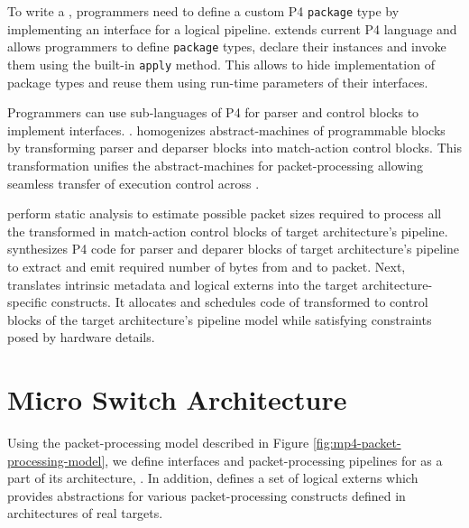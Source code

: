 \documentclass[letterpaper,twocolumn,10pt]{article}
\begin{document}
To write a \uprogram, programmers need to define a custom P4 \texttt{package} type by implementing an interface for a logical pipeline.
\ucomp extends current P4 language and allows programmers to define \texttt{package} types, declare their instances and invoke them using the built-in \texttt{apply} method.
This allows to hide implementation of package types and reuse them using run-time parameters of their interfaces.


Programmers can use sub-languages of P4 for parser and control blocks to implement interfaces.
\ucomp.
\ucomp homogenizes abstract-machines of programmable blocks by transforming parser and deparser blocks into match-action control blocks.
This transformation unifies the abstract-machines for packet-processing allowing seamless transfer of execution control across \uprograms.


\ucomp perform static analysis to estimate possible packet sizes required to process all the transformed \uprograms in match-action control blocks of target architecture's pipeline.
\ucomp synthesizes P4 code for parser and deparer blocks of target architecture's pipeline to extract and emit required number of bytes from and to packet.
Next, \ucomp translates intrinsic metadata and logical externs into the target architecture-specific constructs.
It allocates and schedules code of transformed \uprograms to control blocks of the target architecture's pipeline model while satisfying constraints posed by hardware details.


\section{Micro Switch Architecture}
\label{sec:architecture}
Using the packet-processing model described in Figure \ref{fig:mp4-packet-processing-model}, we define \uprogram interfaces and packet-processing pipelines for \uswitch as a part of its architecture, \uarch.
In addition, \uarch defines a set of logical externs which provides abstractions for various packet-processing constructs defined in architectures of real targets.
\end{document}
